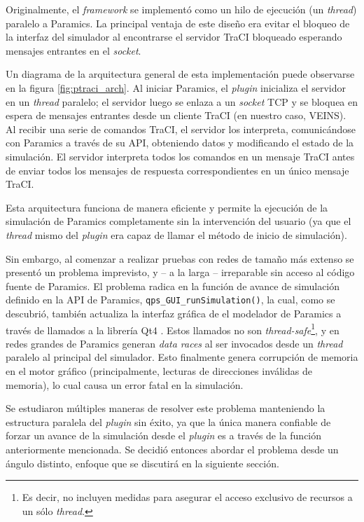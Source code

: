 Originalmente, el \emph{framework} se implementó como un hilo de ejecución (un \emph{thread}) paralelo a Paramics. La principal ventaja de este diseño era evitar el bloqueo de la interfaz del simulador al encontrarse el servidor TraCI bloqueado esperando mensajes entrantes en el \emph{socket}. 

Un diagrama de la arquitectura general de esta implementación puede observarse en la figura \ref{fig:ptraci_arch}. Al iniciar Paramics, el \emph{plugin} inicializa el servidor en un \emph{thread} paralelo; el servidor luego se enlaza a un \emph{socket} TCP y se bloquea en espera de mensajes entrantes desde un cliente TraCI (en nuestro caso, VEINS). Al recibir una serie de comandos TraCI, el servidor los interpreta, comunicándose con Paramics a través de su API, obteniendo datos y modificando el estado de la simulación. El servidor interpreta todos los comandos en un mensaje TraCI antes de enviar todos los mensajes de respuesta correspondientes en un único mensaje TraCI.

Esta arquitectura funciona de manera eficiente y permite la ejecución de la simulación de Paramics completamente sin la intervención del usuario (ya que el \emph{thread} mismo del \emph{plugin} era capaz de llamar el método de inicio de simulación). 

Sin embargo, al comenzar a realizar pruebas con redes de tamaño más extenso se presentó un problema imprevisto, y -- a la larga -- irreparable sin acceso al código fuente de Paramics. El problema radica en la función de avance de simulación definido en la API de Paramics, \texttt{qps\_GUI\_runSimulation()}, la cual, como se descubrió, también actualiza la interfaz gráfica de el modelador de Paramics a través de llamados a la librería Qt4 \cite{qt}. Estos llamados no son \emph{thread-safe}\footnote{Es decir, no incluyen medidas para asegurar el acceso exclusivo de recursos a un sólo \emph{thread}.}, y en redes grandes de Paramics generan \emph{data races} al ser invocados desde un \emph{thread} paralelo al principal del simulador. Esto finalmente genera corrupción de memoria en el motor gráfico (principalmente, lecturas de direcciones inválidas de memoria), lo cual causa un error fatal en la simulación.

Se estudiaron múltiples maneras de resolver este problema manteniendo la estructura paralela del \emph{plugin} sin éxito, ya que la única manera confiable de forzar un avance de la simulación desde el \emph{plugin} es a través de la función anteriormente mencionada. Se decidió entonces abordar el problema desde un ángulo distinto, enfoque que se discutirá en la siguiente sección.

